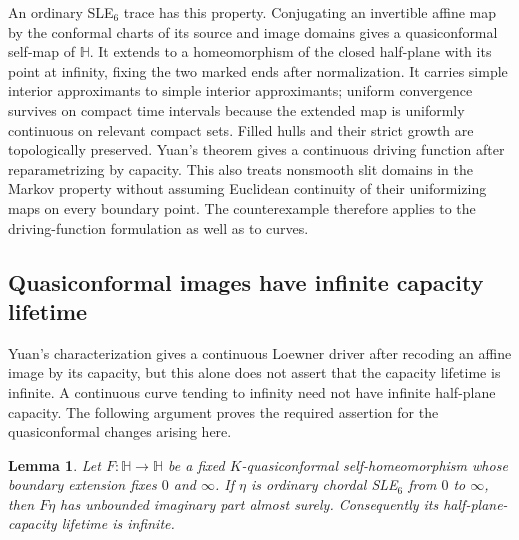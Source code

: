 \documentclass[11pt]{article}
\newtheorem{lemma}[theorem]{Lemma}
\theoremstyle{definition}\newtheorem{definition}[theorem]{Definition}
\theoremstyle{remark}\newtheorem{remark}[theorem]{Remark}
\newcommand{\HH}{\mathbb H}
\begin{document}
An ordinary SLE$_6$ trace has this property. Conjugating an invertible
affine map by the conformal charts of its source and image domains gives
a quasiconformal self-map of $\HH$. It extends to a homeomorphism of the
closed half-plane with its point at infinity, fixing the two marked ends
after normalization. It carries simple interior approximants to simple
interior approximants; uniform convergence survives on compact time
intervals because the extended map is uniformly continuous on relevant
compact sets. Filled hulls and their strict growth are topologically
preserved. Yuan's theorem gives a continuous driving function after
reparametrizing by capacity. This also treats nonsmooth slit domains in
the Markov property without assuming Euclidean continuity of their
uniformizing maps on every boundary point. The counterexample therefore
applies to the driving-function formulation as well as to curves.

\subsection{Quasiconformal images have infinite capacity lifetime}
\label{sec:qc-capacity-lifetime}

Yuan's characterization gives a continuous Loewner driver after recoding
an affine image by its capacity, but this alone does not assert that the
capacity lifetime is infinite.  A continuous curve tending to infinity need
not have infinite half-plane capacity.  The following argument proves the
required assertion for the quasiconformal changes arising here.

\begin{lemma}
Let $F:\mathbb H\to\mathbb H$ be a fixed $K$-quasiconformal
self-homeomorphism whose boundary extension fixes $0$ and $\infty$.
If $\eta$ is ordinary chordal SLE$_6$ from $0$ to $\infty$, then
$F\eta$ has unbounded imaginary part almost surely.  Consequently its
half-plane-capacity lifetime is infinite.
\end{lemma}
\end{document}
